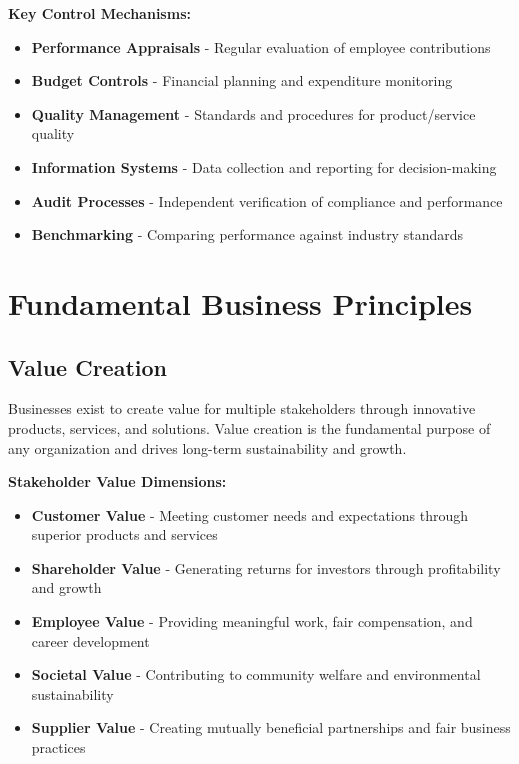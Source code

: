 \documentclass[12pt]{article}
\begin{document}
\textbf{Key Control Mechanisms:}
\begin{itemize}
    \item \textbf{Performance Appraisals} - Regular evaluation of employee contributions
    \item \textbf{Budget Controls} - Financial planning and expenditure monitoring
    \item \textbf{Quality Management} - Standards and procedures for product/service quality
    \item \textbf{Information Systems} - Data collection and reporting for decision-making
    \item \textbf{Audit Processes} - Independent verification of compliance and performance
    \item \textbf{Benchmarking} - Comparing performance against industry standards
\end{itemize}

\section{Fundamental Business Principles}

\subsection{Value Creation}
Businesses exist to create value for multiple stakeholders through innovative products, services, and solutions. Value creation is the fundamental purpose of any organization and drives long-term sustainability and growth.

\textbf{Stakeholder Value Dimensions:}
\begin{itemize}
    \item \textbf{Customer Value} - Meeting customer needs and expectations through superior products and services
    \item \textbf{Shareholder Value} - Generating returns for investors through profitability and growth
    \item \textbf{Employee Value} - Providing meaningful work, fair compensation, and career development
    \item \textbf{Societal Value} - Contributing to community welfare and environmental sustainability
    \item \textbf{Supplier Value} - Creating mutually beneficial partnerships and fair business practices
\end{itemize}
\end{document}
